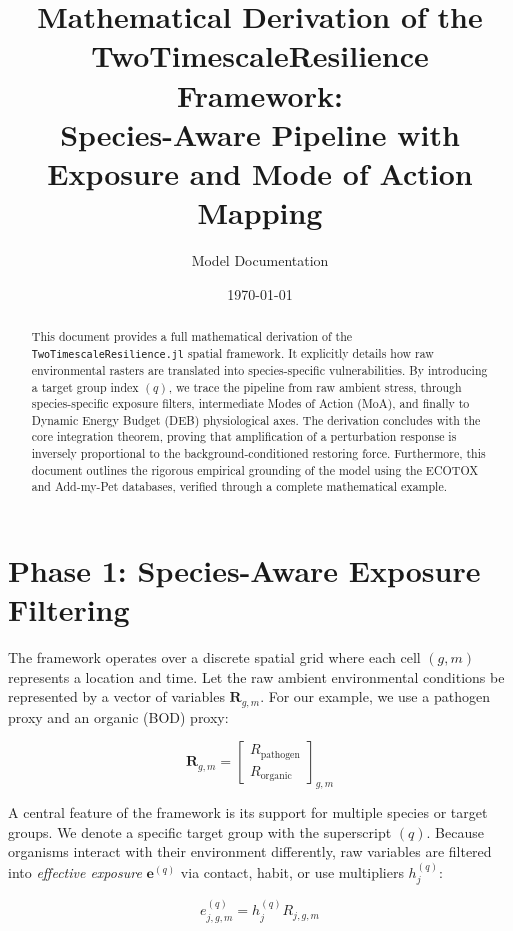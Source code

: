 \documentclass[11pt,a4paper]{article}
\title{Mathematical Derivation of the TwoTimescaleResilience Framework:\\
Species-Aware Pipeline with Exposure and Mode of Action Mapping}
\author{Model Documentation}
\date{\today}
\begin{document}
\maketitle

\begin{abstract}
This document provides a full mathematical derivation of the \texttt{TwoTimescaleResilience.jl} spatial framework. It explicitly details how raw environmental rasters are translated into species-specific vulnerabilities. By introducing a target group index $(q)$, we trace the pipeline from raw ambient stress, through species-specific exposure filters, intermediate Modes of Action (MoA), and finally to Dynamic Energy Budget (DEB) physiological axes. The derivation concludes with the core integration theorem, proving that amplification of a perturbation response is inversely proportional to the background-conditioned restoring force. Furthermore, this document outlines the rigorous empirical grounding of the model using the ECOTOX and Add-my-Pet databases, verified through a complete mathematical example.
\end{abstract}

\section{Phase 1: Species-Aware Exposure Filtering}

The framework operates over a discrete spatial grid where each cell $(g,m)$ represents a location and time. Let the raw ambient environmental conditions be represented by a vector of variables $\bm{R}_{g,m}$. For our example, we use a pathogen proxy and an organic (BOD) proxy:

\begin{equation}
\bm{R}_{g,m}=\begin{bmatrix}R_{\mathrm{pathogen}}\\ R_{\mathrm{organic}}\end{bmatrix}_{g,m}
\end{equation}

A central feature of the framework is its support for multiple species or target groups. We denote a specific target group with the superscript $(q)$. Because organisms interact with their environment differently, raw variables are filtered into \textit{effective exposure} $\bm{e}^{(q)}$ via contact, habit, or use multipliers $h_j^{(q)}$:

\begin{equation}
    e_{j, g, m}^{(q)} = h_{j}^{(q)} R_{j, g, m}
\end{equation}
\end{document}
